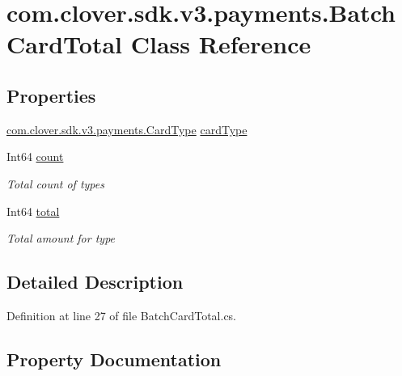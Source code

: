 \hypertarget{classcom_1_1clover_1_1sdk_1_1v3_1_1payments_1_1_batch_card_total}{}\section{com.\+clover.\+sdk.\+v3.\+payments.\+Batch\+Card\+Total Class Reference}
\label{classcom_1_1clover_1_1sdk_1_1v3_1_1payments_1_1_batch_card_total}
\subsection*{Properties}
\begin{DoxyCompactItemize}
\item 
\hyperlink{namespacecom_1_1clover_1_1sdk_1_1v3_1_1payments_ae544d2f27295fd15a3abb7d87bc35928}{com.\+clover.\+sdk.\+v3.\+payments.\+Card\+Type} \hyperlink{classcom_1_1clover_1_1sdk_1_1v3_1_1payments_1_1_batch_card_total_a87bb88bdab111b333df3b2ddb9609b25}{card\+Type}
\item 
Int64 \hyperlink{classcom_1_1clover_1_1sdk_1_1v3_1_1payments_1_1_batch_card_total_a1e20b6f11fba6e10795618ab141cad98}{count}
\begin{DoxyCompactList}\small\item\em Total count of types \end{DoxyCompactList}\item 
Int64 \hyperlink{classcom_1_1clover_1_1sdk_1_1v3_1_1payments_1_1_batch_card_total_a7dff34fb76e90d7e78ca8031b03913b3}{total}
\begin{DoxyCompactList}\small\item\em Total amount for type \end{DoxyCompactList}\end{DoxyCompactItemize}


\subsection{Detailed Description}


Definition at line 27 of file Batch\+Card\+Total.\+cs.



\subsection{Property Documentation}
\mbox{\label{classcom_1_1clover_1_1sdk_1_1v3_1_1payments_1_1_batch_card_total_a87bb88bdab111b333df3b2ddb9609b25}} 
